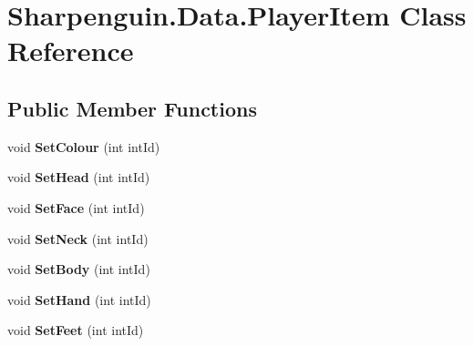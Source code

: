 \hypertarget{classSharpenguin_1_1Data_1_1PlayerItem}{\section{\-Sharpenguin.\-Data.\-Player\-Item \-Class \-Reference}
\label{classSharpenguin_1_1Data_1_1PlayerItem}
}
\subsection*{\-Public \-Member \-Functions}
\begin{DoxyCompactItemize}
\item 
\hypertarget{classSharpenguin_1_1Data_1_1PlayerItem_a0ba43aab58727760a20d0197519a2bd5}{void {\bfseries \-Set\-Colour} (int int\-Id)}\label{classSharpenguin_1_1Data_1_1PlayerItem_a0ba43aab58727760a20d0197519a2bd5}

\item 
\hypertarget{classSharpenguin_1_1Data_1_1PlayerItem_a7e92eb001d9fda4ac63a28d72e1dcb10}{void {\bfseries \-Set\-Head} (int int\-Id)}\label{classSharpenguin_1_1Data_1_1PlayerItem_a7e92eb001d9fda4ac63a28d72e1dcb10}

\item 
\hypertarget{classSharpenguin_1_1Data_1_1PlayerItem_acf3bf50435cba4d176a907acda3430a0}{void {\bfseries \-Set\-Face} (int int\-Id)}\label{classSharpenguin_1_1Data_1_1PlayerItem_acf3bf50435cba4d176a907acda3430a0}

\item 
\hypertarget{classSharpenguin_1_1Data_1_1PlayerItem_aa85fa149653805e76d0b08b1152e0628}{void {\bfseries \-Set\-Neck} (int int\-Id)}\label{classSharpenguin_1_1Data_1_1PlayerItem_aa85fa149653805e76d0b08b1152e0628}

\item 
\hypertarget{classSharpenguin_1_1Data_1_1PlayerItem_a6722340ee606ee2882b1d0911e6a7076}{void {\bfseries \-Set\-Body} (int int\-Id)}\label{classSharpenguin_1_1Data_1_1PlayerItem_a6722340ee606ee2882b1d0911e6a7076}

\item 
\hypertarget{classSharpenguin_1_1Data_1_1PlayerItem_a717f23521a7e4b2fa8ccb3a621973a95}{void {\bfseries \-Set\-Hand} (int int\-Id)}\label{classSharpenguin_1_1Data_1_1PlayerItem_a717f23521a7e4b2fa8ccb3a621973a95}

\item 
\hypertarget{classSharpenguin_1_1Data_1_1PlayerItem_a28e1f569f1a1cafa354d9332947a3bc1}{void {\bfseries \-Set\-Feet} (int int\-Id)}\label{classSharpenguin_1_1Data_1_1PlayerItem_a28e1f569f1a1cafa354d9332947a3bc1}


\end{DoxyCompactItemize}
